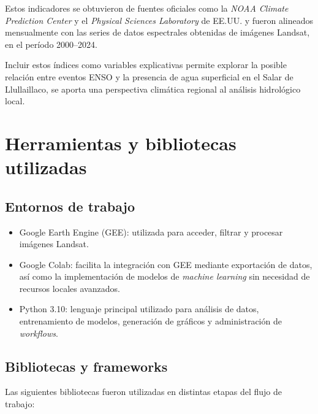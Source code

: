 Estos indicadores se obtuvieron de fuentes oficiales como la \textit{NOAA Climate Prediction Center} y el \textit{Physical Sciences Laboratory} de EE.UU. y fueron alineados mensualmente con las series de datos espectrales obtenidas de imágenes Landsat, en el período 2000–2024.

Incluir estos índices como variables explicativas permite explorar la posible relación entre eventos ENSO y la presencia de agua superficial en el Salar de Llullaillaco, se aporta una perspectiva climática regional al análisis hidrológico local.


\section{Herramientas y bibliotecas utilizadas}


\subsection*{Entornos de trabajo}

\begin{itemize}
    \item Google Earth Engine (GEE): utilizada para acceder, filtrar y procesar imágenes Landsat. 
    
    \item Google Colab: facilita la integración con GEE mediante exportación de datos, así como la implementación de modelos de \textit{machine learning} sin necesidad de recursos locales avanzados.

    \item Python 3.10: lenguaje principal utilizado para análisis de datos, entrenamiento de modelos, generación de gráficos y administración de \textit{workflows}.
\end{itemize}


\subsection*{Bibliotecas y frameworks}

Las siguientes bibliotecas fueron utilizadas en distintas etapas del flujo de trabajo:

